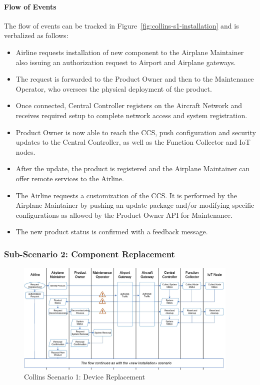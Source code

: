 \paragraph{Flow of Events}

The flow of events can be tracked in Figure~\ref{fig:collins-s1-installation} and is verbalized as follows:

\begin{itemize}
	\item Airline requests installation of new component to the Airplane Maintainer also issuing an authorization
	      request to Airport and Airplane gateways.
	\item The request is forwarded to the Product Owner and then to the Maintenance Operator, who oversees the
	      physical deployment of the product.
	\item Once connected, Central Controller registers on the Aircraft Network and receives required setup to
	      complete network access and system registration.
	\item Product Owner is now able to reach the CCS, push configuration and security updates to the Central
	      Controller, as well as the Function Collector and IoT nodes.
	\item After the update, the product is registered and the Airplane Maintainer can offer remote services to the
	      Airline.
	\item The Airline requests a customization of the CCS. It is performed by the Airplane Maintainer by pushing an
	      update package and/or modifying specific configurations as allowed by the Product Owner API for
	      Maintenance.
	\item The new product status is confirmed with a feedback message.
\end{itemize}

\subsubsection{Sub-Scenario 2: Component Replacement}

\begin{figure}
	\begin{center}
		\includegraphics[width=0.95\textwidth]{figures/collins-s1-replacement.jpg}
	\end{center}
	\caption{Collins Scenario 1: Device Replacement}
	\label{fig:collins-s1-replacement}
\end{figure}

